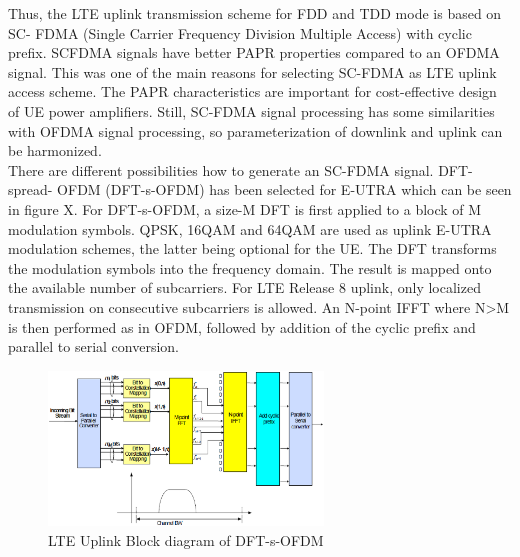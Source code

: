 Thus, the LTE uplink transmission scheme for FDD and TDD mode is based on SC-
FDMA (Single Carrier Frequency Division Multiple Access) with cyclic prefix. SCFDMA
signals have better PAPR properties compared to an OFDMA signal. This was
one of the main reasons for selecting SC-FDMA as LTE uplink access scheme. The
PAPR characteristics are important for cost-effective design of UE power amplifiers.
Still, SC-FDMA signal processing has some similarities with OFDMA signal processing,
so parameterization of downlink and uplink can be harmonized.\\

There are different possibilities how to generate an SC-FDMA signal. DFT-spread-
OFDM (DFT-s-OFDM) has been selected for E-UTRA which can be seen in figure X. For
DFT-s-OFDM, a size-M DFT is first applied to a block of M modulation
symbols. QPSK, 16QAM and 64QAM are used as uplink E-UTRA modulation
schemes, the latter being optional for the UE. The DFT transforms the modulation
symbols into the frequency domain. The result is mapped onto the available number
of subcarriers. For LTE Release 8 uplink, only localized transmission on consecutive
subcarriers is allowed. An N-point IFFT where N>M is then performed as in OFDM,
followed by addition of the cyclic prefix and parallel to serial conversion.

\begin{figure}[htbp]
    \centering
    \includegraphics[width=0.65\textwidth]{./figures/uplink_scheme}
    \caption{ LTE Uplink Block diagram of DFT-s-OFDM
    \label{fig:uplinkbd}}
\end{figure}
